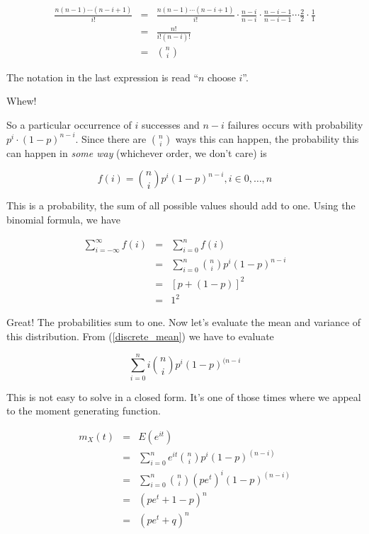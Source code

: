 \documentclass[]{article}
\begin{document}
\begin{eqnarray*}
\frac{n(n-1) \cdots (n-i+1)}{i!} & = & \frac{n(n-1) \cdots (n-i+1)}{i!} \cdot
         \frac{n-i}{n-i} \cdot \frac{n-i-1}{n-i-1} \cdots 
         \frac{2}{2} \cdot \frac{1}{1} \\
      & = & \frac{n!}{i! (n-i)!} \\
      & = & {n \choose i}
\end{eqnarray*}

The notation in the last expression is read ``$n$ choose $i$''.

Whew!

So a particular occurrence of $i$ successes and $n-i$
failures occurs with probability $p^i \cdot (1-p)^{n-i}$.
Since there are ${n \choose i}$ ways this can happen, the
probability this can happen in \emph{some way} 
(whichever order, we don't care) is

\begin{equation} \label{binomial_density}
f(i) = {n \choose i} p^i (1-p)^{n-i}, i \in 0, \ldots, n
\end{equation}

This is a probability, the sum of all possible values
should add to one.  Using the binomial formula, we have

\begin{eqnarray*}
\sum_{i=-\infty}^{\infty} f(i) & = & \sum_{i=0}^{n} f(i) \\
   & = & \sum_{i=0}^{n} {n \choose i} p^i (1-p)^{n-i}  \\
   & = & [ p + (1-p) ]^2 \\
   & = & 1^2
\end{eqnarray*}

Great! The probabilities sum to one.  Now let's evaluate
the mean and variance of this distribution.  From
(\ref{discrete_mean}) we have to evaluate

$$
\sum_{i=0}^n i {n \choose i} p^i (1-p)^{(n-i}
$$

This is not easy to solve in a closed form.  It's
one of those times where we appeal to the moment generating
function.

\begin{eqnarray*}
m_X(t) & = & E(e^{it}) \\
   & = & \sum_{i=0}^n e^{it} {n \choose i} p^i (1-p)^{(n-i)} \\
   & = & \sum_{i=0}^n {n \choose i} (pe^t)^i (1-p)^{(n-i)} \\
   & = & (pe^t + 1 - p)^n \\
   & = & (pe^t + q)^n
\end{eqnarray*}
\end{document}
